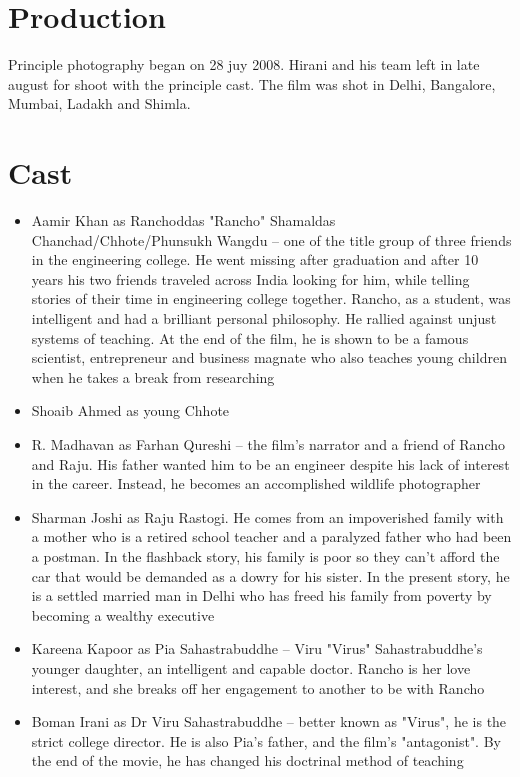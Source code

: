 \documentclass{article}
\begin{document}
\section{Production}
Principle photography began on 28 juy 2008. Hirani and his team left in late august for shoot with the principle cast. The film was shot in Delhi, Bangalore, Mumbai, Ladakh and Shimla. 



\section{Cast}
\begin{itemize}
    \item{Aamir Khan as Ranchoddas "Rancho" Shamaldas Chanchad/Chhote/Phunsukh Wangdu – one of the title group of three friends in the engineering college. He went missing after graduation and after 10 years his two friends traveled across India looking for him, while telling stories of their time in engineering college together. Rancho, as a student, was intelligent and had a brilliant personal philosophy. He rallied against unjust systems of teaching. At the end of the film, he is shown to be a famous scientist, entrepreneur and business magnate who also teaches young children when he takes a break from researching}
    \item{Shoaib Ahmed as young Chhote}
    \item{R. Madhavan as Farhan Qureshi – the film's narrator and a friend of Rancho and Raju. His father wanted him to be an engineer despite his lack of interest in the career. Instead, he becomes an accomplished wildlife photographer}
    \item{Sharman Joshi as Raju Rastogi. He comes from an impoverished family with a mother who is a retired school teacher and a paralyzed father who had been a postman. In the flashback story, his family is poor so they can't afford the car that would be demanded as a dowry for his sister. In the present story, he is a settled married man in Delhi who has freed his family from poverty by becoming a wealthy executive}
    \item{Kareena Kapoor as Pia Sahastrabuddhe – Viru "Virus" Sahastrabuddhe's younger daughter, an intelligent and capable doctor. Rancho is her love interest, and she breaks off her engagement to another to be with Rancho}
    \item{Boman Irani as Dr Viru Sahastrabuddhe – better known as "Virus", he is the strict college director. He is also Pia's father, and the film's "antagonist". By the end of the movie, he has changed his doctrinal method of teaching}

\end{itemize}
\end{document}
